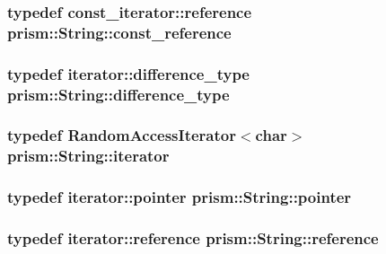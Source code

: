 \subsubsection[{\texorpdfstring{const\+\_\+reference}{const_reference}}]{\setlength{\rightskip}{0pt plus 5cm}typedef {\bf const\+\_\+iterator\+::reference} {\bf prism\+::\+String\+::const\+\_\+reference}}\hypertarget{classprism_1_1_string_a7825c62cb2047e36ec704a17ef94f299}{}\label{classprism_1_1_string_a7825c62cb2047e36ec704a17ef94f299}
\subsubsection[{\texorpdfstring{difference\+\_\+type}{difference_type}}]{\setlength{\rightskip}{0pt plus 5cm}typedef {\bf iterator\+::difference\+\_\+type} {\bf prism\+::\+String\+::difference\+\_\+type}}\hypertarget{classprism_1_1_string_a50fc3d423db1d24c511b28b24e4a7c00}{}\label{classprism_1_1_string_a50fc3d423db1d24c511b28b24e4a7c00}
\subsubsection[{\texorpdfstring{iterator}{iterator}}]{\setlength{\rightskip}{0pt plus 5cm}typedef {\bf Random\+Access\+Iterator}$<$char$>$ {\bf prism\+::\+String\+::iterator}}\hypertarget{classprism_1_1_string_adacc7975837e5fff95d70690777fb330}{}\label{classprism_1_1_string_adacc7975837e5fff95d70690777fb330}
\subsubsection[{\texorpdfstring{pointer}{pointer}}]{\setlength{\rightskip}{0pt plus 5cm}typedef {\bf iterator\+::pointer} {\bf prism\+::\+String\+::pointer}}\hypertarget{classprism_1_1_string_ac7944d9212ad675ba05280657ce14d12}{}\label{classprism_1_1_string_ac7944d9212ad675ba05280657ce14d12}
\subsubsection[{\texorpdfstring{reference}{reference}}]{\setlength{\rightskip}{0pt plus 5cm}typedef {\bf iterator\+::reference} {\bf prism\+::\+String\+::reference}}\hypertarget{classprism_1_1_string_a0abe551090035c27a0f80ea403199727}{}\label{classprism_1_1_string_a0abe551090035c27a0f80ea403199727}
